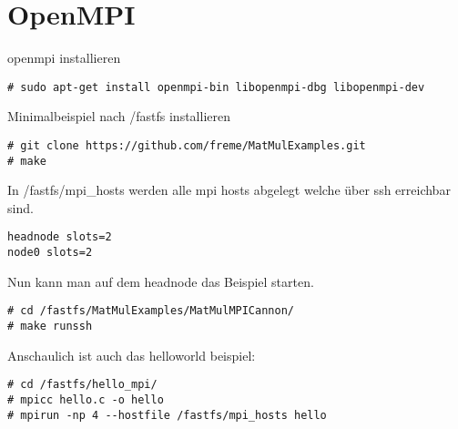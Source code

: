 \chapter{OpenMPI}
openmpi installieren
\begin{lstlisting}[style=Bash]
# sudo apt-get install openmpi-bin libopenmpi-dbg libopenmpi-dev
\end{lstlisting}
Minimalbeispiel nach /fastfs installieren
\begin{lstlisting}[style=Bash]
# git clone https://github.com/freme/MatMulExamples.git
# make
\end{lstlisting}
In /fastfs/mpi\_hosts werden alle mpi hosts abgelegt welche über ssh erreichbar sind.
\begin{lstlisting}[style=Bash]
headnode slots=2
node0 slots=2
\end{lstlisting}
Nun kann man auf dem headnode das Beispiel starten.
\begin{lstlisting}[style=Bash]
# cd /fastfs/MatMulExamples/MatMulMPICannon/
# make runssh
\end{lstlisting}
Anschaulich ist auch das helloworld beispiel:
\begin{lstlisting}[style=Bash]
# cd /fastfs/hello_mpi/
# mpicc hello.c -o hello 
# mpirun -np 4 --hostfile /fastfs/mpi_hosts hello
\end{lstlisting}
